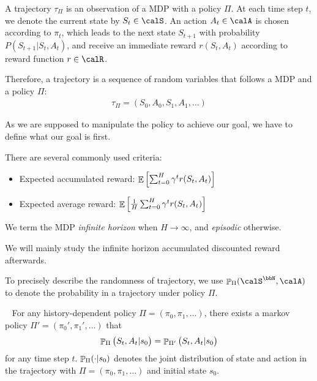 \begin{definition}[Trajectory]\label{def:trajectory}
    A trajectory $\tau_{\Pi}$ is an observation of a MDP with a policy $\Pi$.
    At each time step $t$, we denote the current state by $S_t \in \calS$. An action $A_t \in \calA$ is chosen according to $\pi_t$, which leads to the next state $S_{t+1}$ with probability $P(S_{t+1} | S_t, A_t)$, and receive an immediate reward $r(S_t, A_t)$ according to reward function $r \in \calR$.

    Therefore, a trajectory is a sequence of random variables that follows a MDP and a policy $\Pi$: \begin{align}
        \tau_{\Pi} = \left(S_0, A_0, S_1, A_1, \dots   \right)
    \end{align}
\end{definition}

As we are supposed to manipulate the policy to achieve our goal, we have to define what our goal is first.

\begin{definition}
    There are several commonly used criteria:
    \begin{itemize}
        \item Expected accumulated reward: $\E \left[ \sum_{t=0}^H \gamma^t r(S_t, A_t) \right]$
        \item Expected average reward: $\E \left[ \frac{1}{H}\sum_{t=0}^H \gamma^t r(S_t,A_t) \right]$
    \end{itemize}
    We term the MDP \emph{infinite horizon} when ${H \to \infty}$, and \emph{episodic} otherwise.
\end{definition}
We will mainly study the infinite horizon accumulated discounted reward afterwards.

\begin{proposition}
    To precisely describe the randomness of trajectory, we use $\P_\Pi(\calS^\bbN, \calA)$ to denote the probability in a trajectory under policy $\Pi$.
\end{proposition}

\begin{theorem}~\label{thm:markovian-policy}
    For any history-dependent policy $\Pi=(\pi_0, \pi_1, \dots)$, there exists a markov policy $\Pi'=(\pi_0', \pi_1', \dots)$ that \begin{align}
        \mathrm{\P}_{\Pi} \left( S_t, A_t | s_0 \right)
       =\mathrm{\P}_{\Pi'} \left (S_t, A_t | s_0 \right)
    \end{align}
    for any time step $t$.
    $\P_{\Pi}(\cdot | s_0)$ denotes the joint distribution of state and action in the trajectory with $\Pi=(\pi_0, \pi_1, \dots)$ and initial state $s_0$.
\end{theorem}

